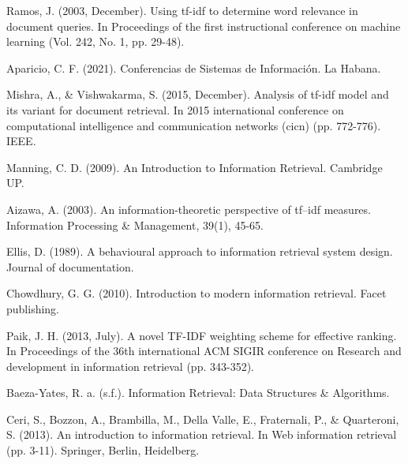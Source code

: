 \documentclass{llncs}
\begin{document}
\tableofcontents
\clearpage



\newpage







\newpage



\newpage



\newpage


%
%
\begin{thebibliography}{}
%

Ramos, J. (2003, December). Using tf-idf to determine word relevance in
document queries. In Proceedings of the first instructional conference on
machine learning (Vol. 242, No. 1, pp. 29-48).

Aparicio, C. F. (2021). Conferencias de Sistemas de Información. La Habana.

Mishra, A., \& Vishwakarma, S. (2015, December). Analysis of tf-idf model and
its variant for document retrieval. In 2015 international conference on
computational intelligence and communication networks (cicn) (pp. 772-776). IEEE.

Manning, C. D. (2009). An Introduction to Information Retrieval. Cambridge UP.

Aizawa, A. (2003). An information-theoretic perspective of tf–idf measures.
Information Processing \& Management, 39(1), 45-65.

Ellis, D. (1989). A behavioural approach to information retrieval system
design. Journal of documentation.

Chowdhury, G. G. (2010). Introduction to modern information retrieval.
Facet publishing.

Paik, J. H. (2013, July). A novel TF-IDF weighting scheme for effective
ranking. In Proceedings of the 36th international ACM SIGIR conference on
Research and development in information retrieval (pp. 343-352).

Baeza-Yates, R. a. (s.f.). Information Retrieval: Data Structures \&
Algorithms.

Ceri, S., Bozzon, A., Brambilla, M., Della Valle, E., Fraternali, P., \&
Quarteroni, S. (2013). An introduction to information retrieval. In Web
information retrieval (pp. 3-11). Springer, Berlin, Heidelberg.


\end{thebibliography}
\end{document}
